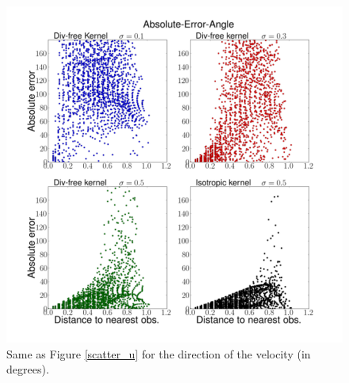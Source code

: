 \documentclass[12pt,a4paper]{article}%
\begin{document}
\begin{figure}
\noindent\includegraphics[width=36
pc]{plots/Absolute-Error-Angle-scatter.png}
\caption{Same as Figure \ref{scatter_u} for the direction of the velocity (in degrees). }
\label{scatter_angle}
\end{figure}
\end{document}
